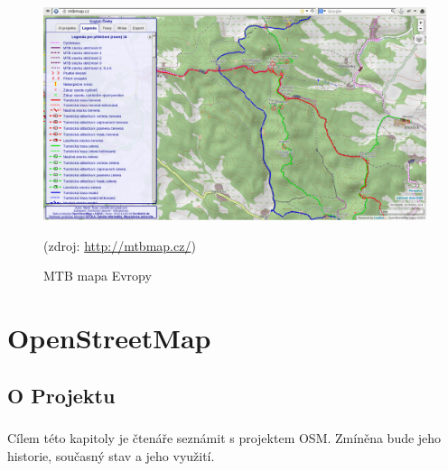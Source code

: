 \documentclass[11pt,a4paper,titlepage,oneside]{book}
\begin{document}
		\begin{figure}[!h]
			\begin{center}
				\includegraphics[width=12cm]{obrazky/mtb.png}
				\caption{MTB mapa Evropy}
				(zdroj: \url{http://mtbmap.cz/})
			\end{center}
		\end{figure}

\chapter{OpenStreetMap}
	\section{O Projektu}

		\paragraph{} Cílem této kapitoly je čtenáře seznámit s projektem \acl{OSM}. Zmíněna bude jeho historie, současný stav a jeho využití.



\end{document}
